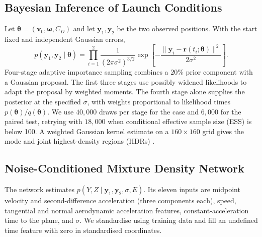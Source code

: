 \documentclass[11pt,a4paper]{article}
\begin{document}
\subsection{Bayesian Inference of Launch Conditions}

Let $\boldsymbol{\theta}=(\mathbf{v}_0,\boldsymbol{\omega},C_D)$ and let $\mathbf{y}_1,\mathbf{y}_2$ be the two observed positions. With the start fixed and independent Gaussian errors,
\begin{equation}
  p(\mathbf{y}_1,\mathbf{y}_2\mid\boldsymbol{\theta})
  =\prod_{i=1}^{2}\frac{1}{(2\pi\sigma^2)^{3/2}}
   \exp\!\left[-\frac{\|\mathbf{y}_i-\mathbf{r}(t_i;\boldsymbol{\theta})\|^2}{2\sigma^2}\right].
  \label{eq:lik}
\end{equation}
Four-stage adaptive importance sampling combines a $20\%$ prior component with a Gaussian proposal. The first three stages use possibly widened likelihoods to adapt the proposal by weighted moments. The fourth stage alone supplies the posterior at the specified $\sigma$, with weights proportional to likelihood times $p(\boldsymbol\theta)/q(\boldsymbol\theta)$. We use $40{,}000$ draws per stage for the case and $6{,}000$ for the paired test, retrying with $18{,}000$ when conditional effective sample size (ESS) is below 100. A weighted Gaussian kernel estimate on a $160\times160$ grid gives the mode and joint highest-density regions (HDRs) \cite{hyndman1996}.

\subsection{Noise-Conditioned Mixture Density Network}

The network estimates $p(Y,Z\mid\mathbf y_1,\mathbf y_2,\sigma,E)$. Its eleven inputs are midpoint velocity and second-difference acceleration (three components each), speed, tangential and normal aerodynamic acceleration features, constant-acceleration time to the plane, and $\sigma$. We standardise using training data and fill an undefined time feature with zero in standardised coordinates.
\end{document}
